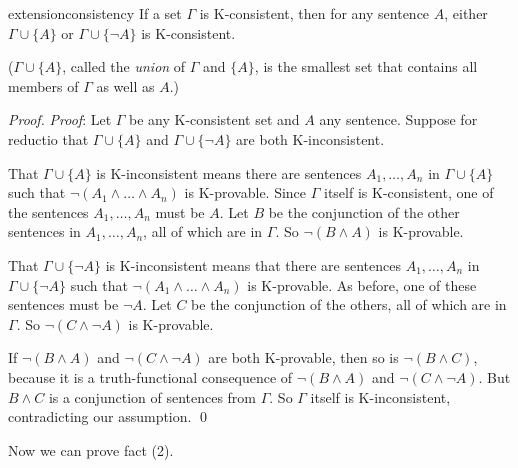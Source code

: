 \begin{observation}{extensionconsistency}
  If a set $\Gamma$ is K-consistent, then for any sentence $A$, either
  $\Gamma \cup \{ A \}$ or $\Gamma \cup \{ \neg A \}$ is K-consistent.
\end{observation}
%
\noindent
($\Gamma \cup \{ A \}$, called the \emph{union} of $\Gamma$ and $\{ A \}$, is
the smallest set that contains all members of $\Gamma$ as well as $A$.)
%
\begin{proof}
  \emph{Proof}: Let $\Gamma$ be any K-consistent set and $A$ any sentence.
  Suppose for reductio that $\Gamma \cup \{ A \}$ and
  $\Gamma \cup \{ \neg A \}$ are both K-inconsistent.

  That $\Gamma \cup \{ A \}$ is K-inconsistent means there are sentences
  $A_1,\ldots,A_n$ in $\Gamma \cup \{ A \}$ such that
  $\neg (A_1\land\ldots\land A_n)$ is K-provable. Since $\Gamma$ itself is
  K-consistent, one of the sentences $A_1,\ldots,A_n$ must be $A$. Let $B$ be
  the conjunction of the other sentences in $A_1,\ldots,A_n$, all of which are
  in $\Gamma$. So $\neg(B \land A)$ is K-provable.

  That $\Gamma \cup \{ \neg A \}$ is K-inconsistent means that there are sentences $A_1,\ldots,A_n$ in $\Gamma \cup \{ \neg A \}$ such that $\neg (A_1\land\ldots\land A_n)$ is K-provable. As before, one of these sentences must be $\neg A$. Let $C$ be the conjunction of the others, all of which are in $\Gamma$. So $\neg(C \land \neg A)$ is K-provable.

  If $\neg(B \land A)$ and $\neg(C \land \neg A)$ are both K-provable, then so
  is $\neg(B \land C)$, because it is a truth-functional consequence of
  $\neg(B \land A)$ and $\neg(C \land \neg A)$. But $B \land C$ is a conjunction
  of sentences from $\Gamma$. So $\Gamma$ itself is K-inconsistent, contradicting our assumption. \qed
\end{proof}

Now we can prove fact (2).

